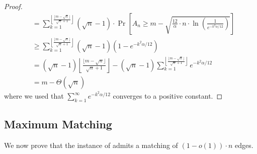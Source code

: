 \documentclass[11pt]{article}
\begin{document}
\begin{proof}
\begin{align*}
& = \sum_{k=1}^{\left\lfloor \frac{\lfloor m - \sqrt{n} \rfloor}{\sqrt{n}+1} \right\rfloor} (\sqrt{n}-1)  \cdot \Pr\left[A_n \geq m - \sqrt{\frac{12}{\alpha} \cdot n\cdot \ln\left(\frac{1}{e^{-k^2\alpha/12}}\right)}\right]\\
& \geq \sum_{k=1}^{\left\lfloor \frac{\lfloor m - \sqrt{n} \rfloor}{\sqrt{n}+1} \right\rfloor} (\sqrt{n}-1) (1 - e^{-k^2\alpha/12}) \\
&= (\sqrt{n}-1)\left\lfloor \frac{\lfloor m - \sqrt{n} \rfloor}{\sqrt{n}+1} \right\rfloor - (\sqrt{n}-1)\sum_{k=1}^{\left\lfloor \frac{\lfloor m - \sqrt{n} \rfloor}{\sqrt{n}+1} \right\rfloor} e^{-k^2\alpha/12}\\
& = m - \Theta(\sqrt{n})
\end{align*}
where we used that $\sum_{k=1}^\infty e^{-k^2\alpha/12}$ converges to a positive constant.
\end{proof}

\subsection{Maximum Matching}\label{sec:LB:maximum}
We now prove that the instance of  admits a matching of $(1-o(1)) \cdot n$ edges. 
\end{document}
